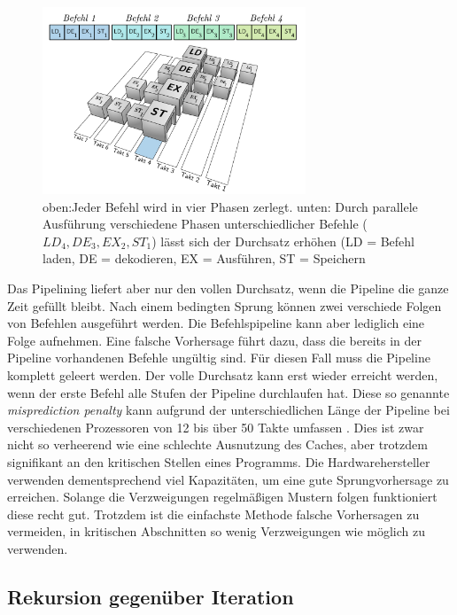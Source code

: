 \begin{figure}\centering
\includegraphics[width=0.7\textwidth]{images/pipeline.pdf} 
\caption[Vierstufiges Pipelining]{oben:Jeder Befehl wird in vier Phasen zerlegt. unten: Durch parallele Ausführung verschiedene Phasen unterschiedlicher Befehle ($LD_4, DE_3, EX_2, ST_1$) lässt sich der Durchsatz erhöhen \footnotesize{(LD = Befehl laden, DE = dekodieren, EX = Ausführen, ST = Speichern}}
\label{fig:pipeline}
\end{figure}

Das Pipelining liefert aber nur den vollen Durchsatz, wenn die Pipeline die ganze Zeit gefüllt bleibt. Nach einem bedingten Sprung können zwei verschiede Folgen von Befehlen ausgeführt werden. Die Befehlspipeline kann aber lediglich eine Folge aufnehmen. Eine falsche Vorhersage führt dazu, dass die bereits in der Pipeline vorhandenen Befehle ungültig sind. Für diesen Fall muss die Pipeline komplett geleert werden. Der volle Durchsatz kann erst wieder erreicht werden, wenn der erste Befehl alle Stufen der Pipeline durchlaufen hat.
Diese so genannte \textit{misprediction penalty} kann aufgrund der unterschiedlichen Länge der Pipeline bei verschiedenen Prozessoren von 12 bis über 50 Takte umfassen \cite{Fog08ASM}. Dies ist zwar nicht so verheerend wie eine schlechte Ausnutzung des Caches, aber trotzdem signifikant an den kritischen Stellen eines Programms.
Die Hardwarehersteller verwenden dementsprechend viel Kapazitäten, um eine gute Sprungvorhersage zu erreichen. Solange die Verzweigungen regelmäßigen Mustern folgen funktioniert diese recht gut.
Trotzdem ist die einfachste Methode falsche Vorhersagen zu vermeiden, in kritischen Abschnitten so wenig Verzweigungen wie möglich zu verwenden.

\subsection{Rekursion gegenüber Iteration}

